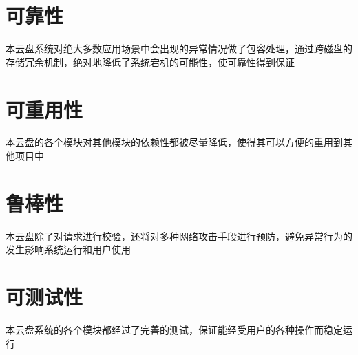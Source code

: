 \section{可靠性}

本云盘系统对绝大多数应用场景中会出现的异常情况做了包容处理，通过跨磁盘的存储冗余机制，绝对地降低了系统宕机的可能性，使可靠性得到保证
 
\section{可重用性}

本云盘的各个模块对其他模块的依赖性都被尽量降低，使得其可以方便的重用到其他项目中

\section{鲁棒性}

本云盘除了对请求进行校验，还将对多种网络攻击手段进行预防，避免异常行为的发生影响系统运行和用户使用

\section{可测试性}

本云盘系统的各个模块都经过了完善的测试，保证能经受用户的各种操作而稳定运行
